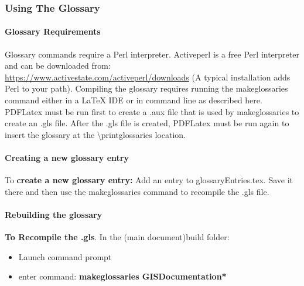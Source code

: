 \subsubsection[Using The Glossary]{Using The Glossary}
\paragraph{Glossary Requirements}
Glossary commands require a Perl interpreter.  Activeperl is a free Perl interpreter and can be downloaded from:\\ \href{https://www.activestate.com/activeperl/downloads}{https://www.activestate.com/activeperl/downloads}
{\tiny (A typical installation adds Perl to your path)}.  Compiling the glossary requires running the makeglossaries command either in a \LaTeX{} IDE or in command line as described here.  PDFLatex must be run first to create a .aux file that is used by makeglossaries to create an .gls file.  After the .gls file is created, PDFLatex must be run again to insert the glossary at the \textbackslash printglossaries location.
\paragraph{Creating a new glossary entry}
To \textbf{create a new glossary entry:} Add an entry to glossaryEntries.tex.  Save it there and then use the makeglossaries command to recompile the .gls file.
\paragraph{Rebuilding the glossary}
\textbf{To Recompile the .gls}.  In the (main document)build folder:
\begin{itemize}
\item Launch command prompt
\item enter command: \textbf{{\large makeglossaries GISDocumentation*}}
\end{itemize}
